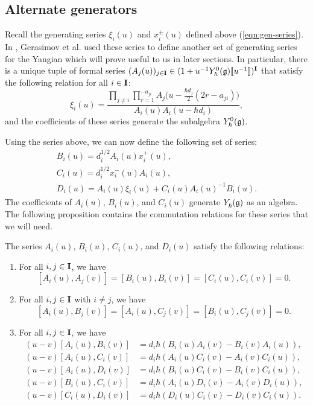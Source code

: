 \subsection{Alternate generators}\label{ssec:alt-gen}

Recall the generating series $\xi_i(u)$ and $x^\pm_i(u)$ defined above (\ref{eqn:gen-series}).
In \cite{gerasimov_class_2005}, Gerasimov et al. used these series to define another set of generating series for the Yangian which will prove useful to us in later sections.
In particular, there is a unique tuple of formal series $(A_j(u))_{j\in\I}\in (1+u^{-1}\Yhg[0]\db{u^{-1}})^\I$ that satisfy the following relation for all $i\in\I$:
\[\xi_i(u) = \frac{\prod\limits_{j\neq i}\prod\limits_{r=1}^{-a_{ji}}A_j\bigl(u-\frac{\hbar d_j}{2}(2r-a_{ji})\bigr)}{A_i(u)A_i(u-\hbar d_i)},\]
and the coefficients of these series generate the subalgebra $\Yhg[0]$.

Using the series above, we can now define the following set of series:
\begin{gather*}
    B_i(u) = d_i^{1/2}A_i(u)x^+_i(u), \\
    C_i(u) = d_i^{1/2}x^-_i(u)A_i(u), \\
    D_i(u) = A_i(u)\xi_i(u) + C_i(u)A_i(u)^{-1}B_i(u).
\end{gather*}
The coefficients of $A_i(u)$, $B_i(u)$, and $C_i(u)$ generate $\Yhg$ as an algebra.
The following proposition \cite[Prop. 2.1]{gerasimov_class_2005} contains the commutation relations for these series that we will need.

\begin{proposition}\label{P:GKLO}
    The series $A_i(u)$, $B_i(u)$, $C_i(u)$, and $D_i(u)$ satisfy the following relations:
    \begin{enumerate}
        \item For all $i,j\in\I$, we have
        \[[A_i(u),A_j(v)] = [B_i(u),B_i(v)] = [C_i(u),C_i(v)] = 0.\]
        \item For all $i,j\in\I$ with $i\neq j$, we have
        \[[A_i(u),B_j(v)] = [A_i(u),C_j(v)] = [B_i(u),C_j(v)] = 0.\]
        \item For all $i,j\in\I$, we have
        \begin{align*}
            (u-v)[A_i(u),B_i(v)] &= d_i\hbar(B_i(u)A_i(v) - B_i(v)A_i(u)), \\
            (u-v)[A_i(u),C_i(v)] &= d_i\hbar(A_i(u)C_i(v) - A_i(v)C_i(u)), \\
            (u-v)[A_i(u),D_i(v)] &= d_i\hbar(B_i(u)C_i(v) - B_i(v)C_i(u)), \\
            (u-v)[B_i(u),C_i(v)] &= d_i\hbar(A_i(u)D_i(v) - A_i(v)D_i(u)), \\
            (u-v)[C_i(u),D_i(v)] &= d_i\hbar(D_i(u)C_i(v) - D_i(v)C_i(u)).
        \end{align*}
    \end{enumerate}
\end{proposition}

